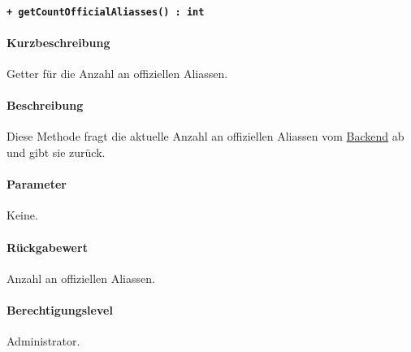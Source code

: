 \paragraph{\texttt{+ getCountOfficialAliasses() : int}}\label{AP_Framework_getCountOfficialAliasses}%
\paragraph*{Kurzbeschreibung}
Getter für die Anzahl an offiziellen Aliassen.
\paragraph*{Beschreibung}
Diese Methode fragt die aktuelle Anzahl an offiziellen Aliassen vom \hyperref[AP_Backend]{Backend} ab und gibt sie zurück.
\paragraph*{Parameter}
Keine.
\paragraph*{Rückgabewert}
Anzahl an offiziellen Aliassen.
\paragraph*{Berechtigungslevel}
Administrator.